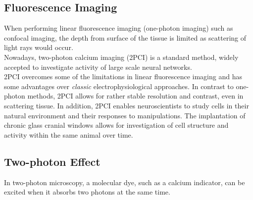\subsection{Fluorescence Imaging}
When performing linear fluorescence imaging (one-photon imaging) such as confocal imaging, the depth from surface of the tissue is limited as scattering of light rays would occur. \cite{Denk2005} \\
Nowadays, two-photon calcium imaging (2PCI) is a standard method, widely accepted to investigate activity of large scale neural networks. \\
2PCI overcomes some of the limitations in linear fluorescence imaging and has some advantages over \textit{classic} electrophysiological approaches. In contrast to one-photon methods, 2PCI allows for rather stable resolution and contrast, even in scattering tissue. In addition, 2PCI enables neuroscientists to study cells in their natural environment and their responses to manipulations. \cite{Denk2005} The implantation of chronic glass cranial windows allows for investigation of cell structure and activity within the same animal over time. \cite{Denk2005}
\subsection{Two-photon Effect}
In two-photon microscopy, a molecular dye, such as a calcium indicator, can be excited when it absorbs two photons at the same time.\cite{Denk1990} 
